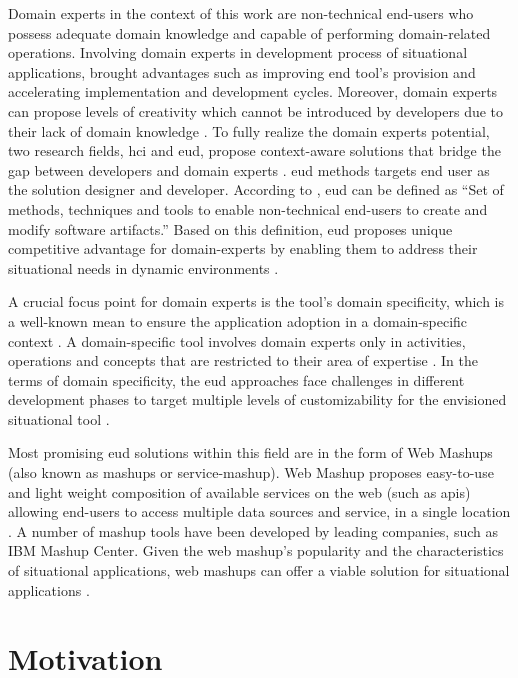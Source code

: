 Domain experts in the context of this work are non-technical end-users
who possess adequate domain knowledge and capable of performing
domain-related operations. Involving domain experts in development
process of situational applications, brought advantages such as
improving end tool's provision and accelerating implementation and
development cycles. Moreover, domain experts can propose levels of
creativity which cannot be introduced by developers due to their lack of
domain knowledge \autocite{Ponce2022}. To fully realize the domain experts potential, two research fields,
\gls{hci} and \gls{eud}, propose
context-aware solutions that bridge the gap between developers and
domain experts \autocite{Wei2020}. \gls{eud} methods targets end user
as the solution designer and developer. According to \autocite{Lieberman2006}, \gls{eud} can be defined as ``Set of methods, techniques and
tools to enable non-technical end-users to create and modify software
artifacts.'' Based on this definition, \gls{eud} proposes unique competitive
advantage for domain-experts by enabling them to address their
situational needs in dynamic environments \autocite{HenryLiebermanFabioPaterno2004}.

A crucial focus point for domain experts is the tool's domain
specificity, which is a well-known mean to ensure the application
adoption in a domain-specific context \autocite{Ardito2018}. A
domain-specific tool involves domain experts only in activities,
operations and concepts that are restricted to their area of expertise
\autocite{Soi2014a}. In the terms of domain specificity, the \gls{eud}
approaches face challenges in different development phases to target
multiple levels of customizability for the envisioned situational tool
\autocite{Ponce2022}.

Most promising \gls{eud} solutions within this field are in the form of Web
Mashups (also known as mashups or service-mashup). Web Mashup proposes
easy-to-use and light weight composition of available services on the
web (such as \gls{api}s) allowing end-users to access multiple data sources
and service, in a single location \autocite{Santos2019}. A number
of mashup tools have been developed by leading companies, such as IBM
Mashup Center. Given the web mashup's popularity and the characteristics
of situational applications, web mashups can offer a viable solution for
situational applications \autocite{Cao2017}.


\vspace{-15pt}
\hypertarget{motivation}{%
\section{Motivation}\label{motivation}}
\vspace{15pt}

